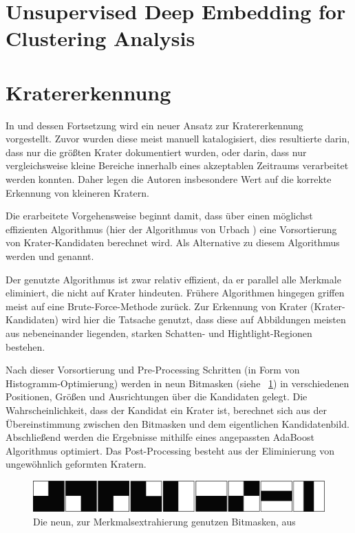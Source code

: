 \section{Unsupervised Deep Embedding for Clustering Analysis}
\label{sec:unsupervised_dec}
\cite{junyuan_16}

\section{Kratererkennung} %
\label{sec:craterdetection}

In \cite{bandeira_10} und dessen Fortsetzung \cite{bandeira_12} wird ein neuer Ansatz zur Kratererkennung vorgestellt. Zuvor wurden diese meist manuell katalogisiert, dies resultierte darin, dass nur die größten Krater dokumentiert wurden, oder darin, dass nur vergleichsweise kleine Bereiche innerhalb eines akzeptablen Zeitraums verarbeitet werden konnten. Daher legen die Autoren insbesondere Wert auf die korrekte Erkennung von kleineren Kratern.

Die erarbeitete Vorgehensweise beginnt damit, dass über einen möglichst effizienten Algorithmus (hier der Algorithmus von Urbach \etal \cite{urbach_stepinski_2009}) eine Vorsortierung von Krater-Kandidaten berechnet wird. Als Alternative zu diesem Algorithmus werden \cite{bandeira_07} und \cite{salamuniccar_10} genannt.

Der genutzte Algorithmus ist zwar relativ effizient, da er parallel alle Merkmale eliminiert, die nicht auf Krater hindeuten. Frühere Algorithmen hingegen griffen meist auf eine Brute-Force-Methode zurück. Zur Erkennung von Krater (\bzw Krater-Kandidaten) wird hier die Tatsache genutzt, dass diese auf Abbildungen meisten aus nebeneinander liegenden, starken Schatten- und Hightlight-Regionen bestehen.

Nach dieser Vorsortierung und Pre-Processing Schritten (in Form von Histogramm-Optimierung) werden in \cite{bandeira_10, bandeira_12} neun Bitmasken (siehe \figurename~\ref{fig:BDS12_01}) in verschiedenen Positionen, Größen und Ausrichtungen über die Kandidaten gelegt. Die Wahrscheinlichkeit, dass der Kandidat ein Krater ist, berechnet sich aus der Übereinstimmung zwischen den Bitmasken und dem eigentlichen Kandidatenbild. Abschließend werden die Ergebnisse mithilfe eines angepassten AdaBoost Algorithmus optimiert. Das Post-Processing besteht aus der Eliminierung von ungewöhnlich geformten Kratern.

\begin{figure}[h]
	\centering
	\includegraphics[width=.8\textwidth,keepaspectratio]{images/BDS12_01.png}
	\caption{Die neun, zur Merkmalsextrahierung genutzen Bitmasken, aus \cite{bandeira_12}}
	\label{fig:BDS12_01}
\end{figure}

